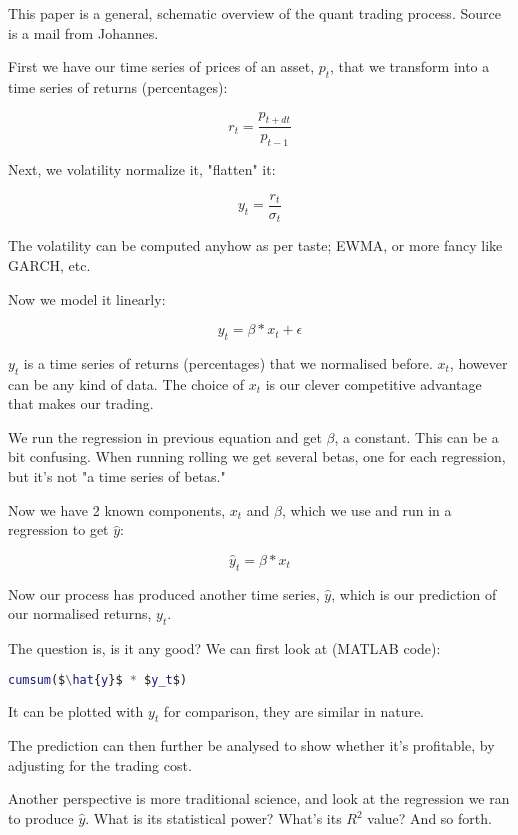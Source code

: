 \documentclass[a4paper]{article}
\title{\documenttitle}
\date{\today}
\author{Frans Englich\texorpdfstring \\
        \href{mailto:fenglich@fastmail.fm}{fenglich@fastmail.fm}}
\begin{document}
\maketitle

This paper is a general, schematic overview of the quant trading process. Source is a mail from Johannes.

First we have our time series of prices of an asset, $p_t$, that we transform into a time series of returns (percentages):

\begin{equation*}
    r_t = \frac{p_{t + dt}}{p_{t - 1}}
\end{equation*}

Next, we volatility normalize it, "flatten" it:

\begin{equation*}
    y_t = \frac{r_t}{\sigma_t}
\end{equation*}

The volatility can be computed anyhow as per taste; EWMA, or more fancy like GARCH, etc.

Now we model it linearly:

\begin{equation*}
    y_t = \beta*x_t + \epsilon
\end{equation*}

$y_t$ is a time series of returns (percentages) that we normalised before. $x_t$, however can be any kind of data. The choice of $x_t$ is our clever competitive advantage that makes our trading.

We run the regression in previous equation and get $\beta$, a constant. This can be a bit confusing. When running rolling we get several betas, one for each regression, but it's not "a time series of betas."

Now we have 2 known components, $x_t$ and $\beta$, which we use and run in a regression to get $\hat{y}$:

\begin{equation*}
    \hat{y}_t = \beta*x_t   
\end{equation*}

Now our process has produced another time series, $\hat{y}$, which is our prediction of our normalised returns, $y_t$.

The question is, is it any good? We can first look at (MATLAB code):

\begin{lstlisting}[language=Matlab, mathescape=true]
cumsum($\hat{y}$ * $y_t$)
\end{lstlisting}

It can be plotted with $y_t$ for comparison, they are similar in nature.

The prediction can then further be analysed to show whether it's profitable, by adjusting for the trading cost.

Another perspective is more traditional science, and look at the regression we ran to produce $\hat{y}$. What is its statistical power? What's its $R^2$ value? And so forth.
\end{document}
